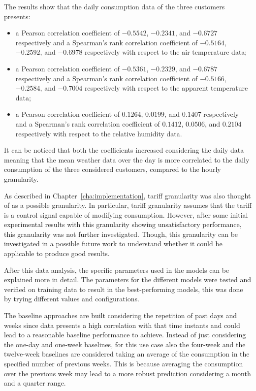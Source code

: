 The results show that the daily consumption data of the three customers presents:
\begin{itemize}
  \item a Pearson correlation coefficient of $-0.5542$, $-0.2341$, and $-0.6727$ respectively and a Spearman's rank correlation coefficient of $-0.5164$, $-0.2592$, and $-0.6978$ respectively with respect to the air temperature data;
  \item a Pearson correlation coefficient of $-0.5361$, $-0.2329$, and $-0.6787$ respectively and a Spearman's rank correlation coefficient of $-0.5166$, $-0.2584$, and $-0.7004$ respectively with respect to the apparent temperature data;
  \item a Pearson correlation coefficient of $0.1264$, $0.0199$, and $0.1407$ respectively and a Spearman's rank correlation coefficient of $0.1412$, $0.0506$, and $0.2104$ respectively with respect to the relative humidity data.
\end{itemize}
It can be noticed that both the coefficients increased considering the daily data meaning that the mean weather data over the day is more correlated to the daily consumption of the three considered customers, compared to the hourly granularity.

As described in Chapter~\ref{cha:implementation}, tariff granularity was also thought of as a possible granularity.
In particular, tariff granularity assumes that the tariff is a control signal capable of modifying consumption.
However, after some initial experimental results with this granularity showing unsatisfactory performance, this granularity was not further investigated.
Though, this granularity can be investigated in a possible future work to understand whether it could be applicable to produce good results.

After this data analysis, the specific parameters used in the models can be explained more in detail.
The parameters for the different models were tested and verified on training data to result in the best-performing models, this was done by trying different values and configurations.

The baseline approaches are built considering the repetition of past days and weeks since data presents a high correlation with that time instants and could lead to a reasonable baseline performance to achieve.
Instead of just considering the one-day and one-week baselines, for this use case also the four-week and the twelve-week baselines are considered taking an average of the consumption in the specified number of previous weeks.
This is because averaging the consumption over the previous week may lead to a more robust prediction considering a month and a quarter range.

